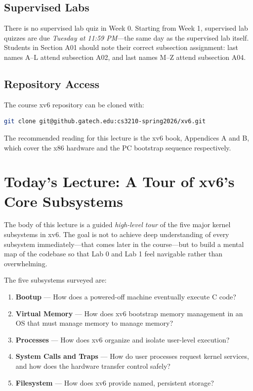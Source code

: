 \documentclass[11pt]{article}
\begin{document}
\subsection{Supervised Labs}

There is no supervised lab quiz in Week 0. Starting from Week 1, supervised lab quizzes are due \emph{Tuesday at 11:59 PM}---the same day as the supervised lab itself. Students in Section A01 should note their correct subsection assignment: last names A--L attend subsection A02, and last names M--Z attend subsection A04.

\subsection{Repository Access}

The course xv6 repository can be cloned with:

\begin{lstlisting}[language=bash, caption={Cloning the xv6 course repository}]
git clone git@github.gatech.edu:cs3210-spring2026/xv6.git
\end{lstlisting}

The recommended reading for this lecture is the xv6 book, Appendices A and B, which cover the x86 hardware and the PC bootstrap sequence respectively.

\section{Today's Lecture: A Tour of xv6's Core Subsystems}

The body of this lecture is a guided \emph{high-level tour} of the five major kernel subsystems in xv6. The goal is not to achieve deep understanding of every subsystem immediately---that comes later in the course---but to build a mental map of the codebase so that Lab 0 and Lab 1 feel navigable rather than overwhelming.

The five subsystems surveyed are:

\begin{enumerate}
    \item \textbf{Bootup} --- How does a powered-off machine eventually execute C code?
    \item \textbf{Virtual Memory} --- How does xv6 bootstrap memory management in an OS that must manage memory to manage memory?
    \item \textbf{Processes} --- How does xv6 organize and isolate user-level execution?
    \item \textbf{System Calls and Traps} --- How do user processes request kernel services, and how does the hardware transfer control safely?
    \item \textbf{Filesystem} --- How does xv6 provide named, persistent storage?
\end{enumerate}
\end{document}
